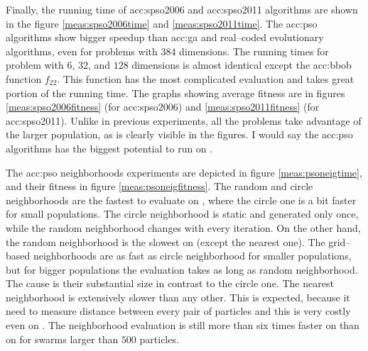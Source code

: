 Finally, the running time of \acrshort{acc:spso2006} and \acrshort{acc:spso2011} algorithms are shown in the figure \ref{meas:spso2006time} and \ref{meas:spso2011time}. The \acrshort{acc:pso} algorithms show bigger speedup than \acrshort{acc:ga} and real--coded evolutionary algorithms, even for problems with $384$ dimensions. The running times for problem with $6$, $32$, and $128$ dimensions is almost identical except the \acrshort{acc:bbob} function $f_{22}$. This function has the most complicated evaluation and takes great portion of the running time. The graphs showing average fitness are in figures \ref{meas:spso2006fitness} (for \acrshort{acc:spso2006}) and \ref{meas:spso2011fitness} (for \acrshort{acc:spso2011}). Unlike in previous experiments, all the problems take advantage of the larger population, as is clearly visible in the figures. I would say the \acrshort{acc:pso} algorithms has the biggest potential to run on \gpuns.

The \acrshort{acc:pso} neighborhoods experiments are depicted in figure \ref{meas:psoneigtime}, and their fitness in figure \ref{meas:psoneigfitness}. The random and circle neighborhoods are the fastest to evaluate on \gpuns, where the circle one is a bit faster for small populations. The circle neighborhood is static and generated only once, while the random neighborhood changes with every iteration. On the other hand, the random neighborhood is the slowest on \cpu (except the nearest one). The grid--based neighborhoods are as fast as circle neighborhood for smaller populations, but for bigger populations the evaluation takes as long as random neighborhood. The cause is their substantial size in contrast to the circle one. The nearest neighborhood is extensively slower than any other. This is expected, because it need to measure distance between every pair of particles and this is very costly even on \gpuns. The neighborhood evaluation is still more than six times faster on \gpu than on \cpu for swarms larger than $500$ particles.